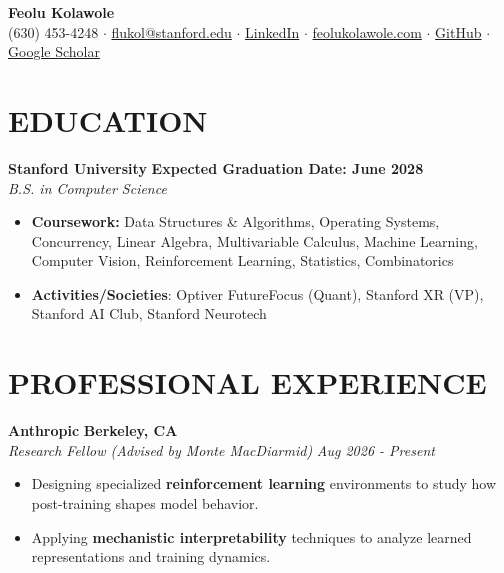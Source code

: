 \documentclass[10pt, letterpaper]{article}
\begin{document}
\begin{center}
  {\LARGE\textbf{Feolu Kolawole}}\\[3pt]
  (630) 453-4248 $\cdot$ \href{mailto:flukol@stanford.edu}{flukol@stanford.edu} $\cdot$
  \href{https://linkedin.com/in/feolu-kolawole}{LinkedIn} $\cdot$
  \href{https://feolukolawole.com}{feolukolawole.com} $\cdot$
  \href{https://github.com/FeoluK}{GitHub} $\cdot$
  \href{https://scholar.google.com/citations?user=--VbwJ0AAAAJ}{Google Scholar}
\end{center}

\section{EDUCATION}

\textbf{Stanford University} \hfill \textbf{Expected Graduation Date: June 2028}\\
\textit{B.S. in Computer Science}
\begin{itemize}[leftmargin=1.5em, topsep=2pt, itemsep=1pt, parsep=0pt]
  \item \textbf{Coursework:} Data Structures \& Algorithms, Operating Systems, Concurrency, Linear Algebra, Multivariable
  Calculus, Machine Learning, Computer Vision, Reinforcement Learning, Statistics, Combinatorics
  \item \textbf{Activities/Societies}: Optiver FutureFocus (Quant), Stanford XR (VP), Stanford AI Club, Stanford Neurotech
\end{itemize}

\section{PROFESSIONAL EXPERIENCE}

\textbf{Anthropic} \hfill \textbf{Berkeley, CA}\\
\textit{Research Fellow (Advised by Monte MacDiarmid)} \hfill \textit{Aug 2026 - Present}
\begin{itemize}[leftmargin=1.5em, topsep=2pt, itemsep=1pt, parsep=0pt]
  \item Designing specialized \textbf{reinforcement learning} environments to study how post-training shapes model behavior.
  \item Applying \textbf{mechanistic interpretability} techniques to analyze learned representations and training dynamics.
\end{itemize}
\end{document}
